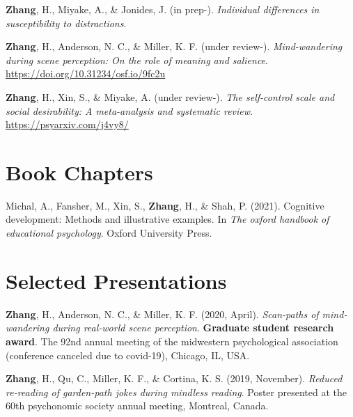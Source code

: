 \documentclass[11pt, a4paper]{awesome-cv}
\begin{document}
\hypertarget{refs_inprogress}{}
\leavevmode\hypertarget{ref-zhang_individual_2021}{}%
\textbf{Zhang}, H., Miyake, A., \& Jonides, J. (in prep-).
\emph{Individual differences in susceptibility to distractions}.

\leavevmode\hypertarget{ref-zhang_meaning_2020}{}%
\textbf{Zhang}, H., Anderson, N. C., \& Miller, K. F. (under review-).
\emph{Mind-wandering during scene perception: On the role of meaning and
salience}. \url{https://doi.org/10.31234/osf.io/9fc2u}

\leavevmode\hypertarget{ref-zhang_self-control_nodate}{}%
\textbf{Zhang}, H., Xin, S., \& Miyake, A. (under review-). \emph{The
self-control scale and social desirability: A meta-analysis and
systematic review}. \url{https://psyarxiv.com/j4vy8/}

\endgroup

\hypertarget{book-chapters}{%
\section{Book Chapters}\label{book-chapters}}

\begingroup
\setlength{\parindent}{-0.5in}
\setlength{\leftskip}{0.5in}

\hypertarget{refs_books}{}
\leavevmode\hypertarget{ref-michal_cognitive_2021}{}%
Michal, A., Fansher, M., Xin, S., \textbf{Zhang}, H., \& Shah, P.
(2021). Cognitive development: Methods and illustrative examples. In
\emph{The oxford handbook of educational psychology}. Oxford University
Press.

\endgroup

\hypertarget{selected-presentations}{%
\section{Selected Presentations}\label{selected-presentations}}

\begingroup
\setlength{\parindent}{-0.5in}
\setlength{\leftskip}{0.5in}

\hypertarget{refs_presentations}{}
\leavevmode\hypertarget{ref-zhang_scan-paths_2020}{}%
\textbf{Zhang}, H., Anderson, N. C., \& Miller, K. F. (2020, April).
\emph{Scan-paths of mind-wandering during real-world scene perception}.
\textbf{Graduate student research award}. The 92nd annual meeting of the
midwestern psychological association (conference canceled due to
covid-19), Chicago, IL, USA.

\leavevmode\hypertarget{ref-zhang_reduced_2019}{}%
\textbf{Zhang}, H., Qu, C., Miller, K. F., \& Cortina, K. S. (2019,
November). \emph{Reduced re-reading of garden-path jokes during mindless
reading}. Poster presented at the 60th psychonomic society annual
meeting, Montreal, Canada.
\end{document}
